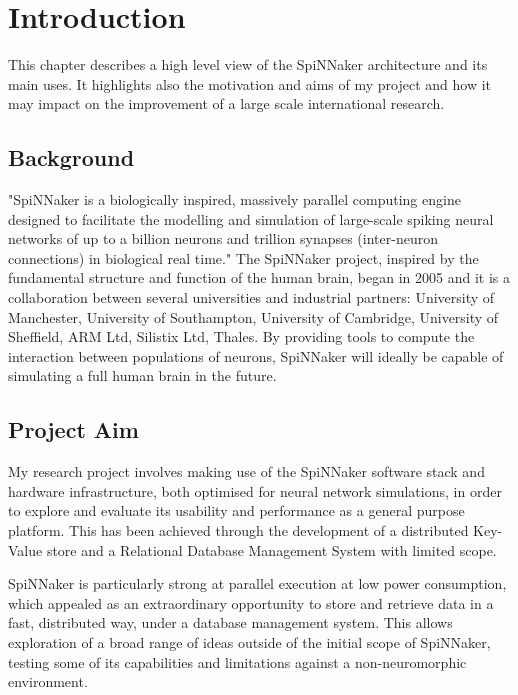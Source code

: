 \chapter{Introduction}
\label{cha:intro}

This chapter describes a high level view of the SpiNNaker architecture and its main uses. It highlights also the motivation and aims of my project and how it may impact on the improvement of a large scale international research.

\section{Background}
\label{sec:background}

"SpiNNaker is a biologically inspired, massively parallel computing engine designed to facilitate the modelling and simulation of large-scale spiking neural networks of up to a billion neurons and trillion synapses (inter-neuron connections) in biological real time." \cite{painkras} The SpiNNaker project, inspired by the fundamental structure and function of the human brain, began in 2005 and it is a collaboration between several universities and industrial partners: University of Manchester, University of Southampton, University of Cambridge, University of Sheffield, ARM Ltd, Silistix Ltd, Thales. \cite{spinnproject} By providing tools to compute the interaction between populations of neurons, SpiNNaker will ideally be capable of simulating a full human brain in the future.

\section{Project Aim}
\label{sec:aim}

My research project involves making use of the SpiNNaker software stack and hardware infrastructure, both optimised for neural network simulations, in order to explore and evaluate its usability and performance as a general purpose platform. This has been achieved through the development of a distributed Key-Value store and a Relational Database Management System with limited scope.

SpiNNaker is particularly strong at parallel execution at low power consumption, which appealed as an extraordinary opportunity to store and retrieve data in a fast, distributed way, under a database management system. This allows exploration of a broad range of ideas outside of the initial scope of SpiNNaker, testing some of its capabilities and limitations against a non-neuromorphic environment.

